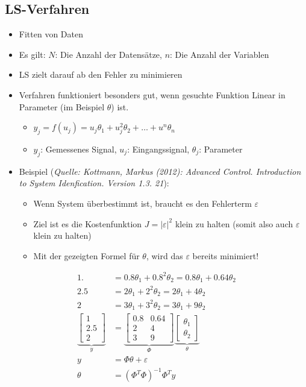 \subsection{LS-Verfahren}
\begin{itemize}
	\item Fitten von Daten
	\item Es gilt: $N$: Die Anzahl der Datensätze, $n$: Die Anzahl der Variablen
	\item LS zielt darauf ab den Fehler zu minimieren
	\item Verfahren funktioniert besonders gut, wenn gesuchte Funktion Linear in Parameter (im Beispiel $\theta$) ist.
	\begin{itemize}
		\item[] $y_j = f(u_j) = u_j\theta_1+u^2_j\theta_2+\ldots+u^n\theta_n$
		\item $y_j$: Gemessenes Signal, \quad $u_j$: Eingangssignal, \quad $\theta_j$: Parameter
	\end{itemize}
	\item Beispiel (\textit{Quelle: Kottmann, Markus (2012): Advanced Control. Introduction to System Idenfication. Version 1.3. 21}):
	\begin{itemize}
		\item Wenn System überbestimmt ist, braucht es den Fehlerterm $\varepsilon$
		\item Ziel ist es die Kostenfunktion  $J= \vert\varepsilon\vert^2$ klein zu halten (somit also auch $\varepsilon$ klein zu halten)
		\item Mit der gezeigten Formel für $\theta$, wird das $\varepsilon$ bereits minimiert!
	\end{itemize}
\end{itemize}
\begin{align*}
	1. &= 0.8 \theta_1 + 0.8^2\theta_2 = 0.8 \theta_1+0.64\theta_2\\
	2.5 &= 2 \theta_1 + 2^2\theta_2 = 2\theta_1+4\theta_2\\
	2 &= 3 \theta_1 + 3^2\theta_2 = 3 \theta_1+9\theta_2\\
 	\underbrace{ \begin{bmatrix}
 	1 \\ 2.5\\2
 	\end{bmatrix}}_y &= 
	\underbrace{\begin{bmatrix}
		0.8 	& 	0.64\\
		2   	&	4	\\
		3		&	9
		\end{bmatrix}}_\Phi
	\underbrace{\begin{bmatrix}
		\theta_1\\
		\theta_2
		\end{bmatrix}}_\theta\\
	y &= \Phi\theta+\varepsilon\\
	\theta &= \left(\Phi^T\Phi\right)^{-1}\Phi^Ty
\end{align*}

